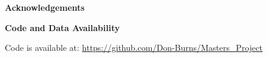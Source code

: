 
\mbox{}\newline\vspace{10mm} \mbox{}\LARGE
%
{\bf Acknowledgements} \normalsize \vspace{5mm}



\mbox{}\newline\vspace{10mm} \mbox{}\LARGE{\bf Code and Data Availability} \normalsize

Code is available at: \url{https://github.com/Don-Burns/Masters_Project}

